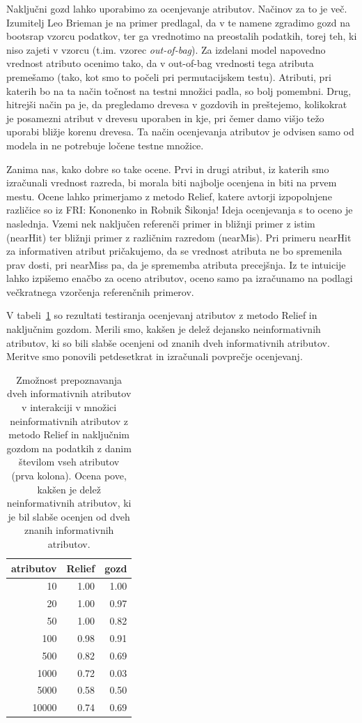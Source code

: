 Naključni gozd lahko uporabimo za ocenjevanje atributov. Načinov za to je več. Izumitelj Leo Brieman je na primer predlagal, da v te namene zgradimo gozd na bootsrap vzorcu podatkov, ter ga vrednotimo na preostalih podatkih, torej teh, ki niso zajeti v vzorcu (t.im. vzorec {\em out-of-bag}). Za izdelani model napovedno vrednost atributo ocenimo tako, da v out-of-bag vrednosti tega atributa premešamo (tako, kot smo to počeli pri permutacijskem testu). Atributi, pri katerih bo na ta način točnost na testni množici padla, so bolj pomembni. Drug, hitrejši način pa je, da pregledamo drevesa v gozdovih in preštejemo, kolikokrat je posamezni atribut v drevesu uporaben in kje, pri čemer damo višjo težo uporabi bližje korenu drevesa. Ta način ocenjevanja atributov je odvisen samo od modela in ne potrebuje ločene testne množice.

Zanima nas, kako dobre so take ocene. Prvi in drugi atribut, iz katerih smo izračunali vrednost razreda, bi morala biti najbolje ocenjena in biti na prvem mestu. Ocene lahko primerjamo z metodo Relief, katere avtorji izpopolnjene različice so iz FRI: Kononenko in Robnik Šikonja! Ideja ocenjevanja s to oceno je naslednja. Vzemi nek naključen referenči primer in bližnji primer z istim (nearHit) ter bližnji primer z različnim razredom (nearMis). Pri primeru nearHit za informativen atribut pričakujemo, da se vrednost atributa ne bo spremenila prav dosti, pri nearMiss pa, da je sprememba atributa precejšnja. Iz te intuicije lahko izpišemo enačbo za oceno atributov, oceno samo pa izračunamo na podlagi večkratnega vzorčenja referenčnih primerov.

V tabeli~\ref{t:fss-xor} so rezultati testiranja ocenjevanj atributov z metodo Relief in naključnim gozdom. Merili smo, kakšen je delež dejansko neinformativnih atributov, ki so bili slabše ocenjeni od znanih dveh informativnih atributov. Meritve smo ponovili petdesetkrat in izračunali povprečje ocenjevanj. 

\begin{table}[htbp]
  \begin{center}
    \begin{tabular}{rrr}
      \toprule
      atributov & Relief & gozd \\
      \midrule
 10 & 1.00 & 1.00 \\
 20 & 1.00 & 0.97 \\
 50 & 1.00 & 0.82 \\
100 & 0.98 & 0.91 \\
500 & 0.82 & 0.69 \\
1000 & 0.72 & 0.03 \\
5000 & 0.58 & 0.50 \\
10000 & 0.74 & 0.69 \\
      \bottomrule
    \end{tabular}
  \end{center}
  \caption{Zmožnost prepoznavanja dveh informativnih atributov v interakciji v množici neinformativnih atributov z metodo Relief in naključnim gozdom na podatkih z danim številom vseh atributov (prva kolona). Ocena pove, kakšen je delež neinformativnih atributov, ki je bil slabše ocenjen od dveh znanih informativnih atributov.}
  \label{t:fss-xor}
\end{table}

